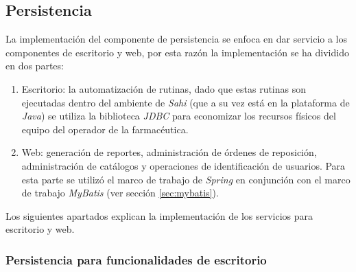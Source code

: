 \subsection{Persistencia}\label{sec:persistence}
La implementación del componente de persistencia se enfoca en dar servicio a los componentes de escritorio y web, por esta razón la implementación se ha dividido en dos partes:
\begin{enumerate}
 	\item Escritorio: la automatización de rutinas, dado que estas rutinas son ejecutadas dentro del ambiente de \textit{Sahi} (que a su vez está en la plataforma de \textit{Java}) se utiliza la biblioteca \textit{JDBC} para economizar los recursos físicos del equipo del operador de la farmacéutica.
 	\item Web: generación de reportes, administración de órdenes de reposición, administración de catálogos y operaciones de identificación  de usuarios. Para esta parte se utilizó el marco de trabajo de \textit{Spring} en conjunción con el marco de trabajo \textit{MyBatis} (ver sección \ref{sec:mybatis}).
\end{enumerate}
Los siguientes apartados explican la implementación de los servicios para escritorio y web.

\subsubsection{Persistencia para funcionalidades de escritorio}
